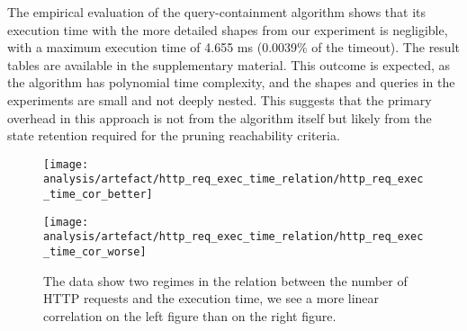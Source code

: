 The empirical evaluation of the query-containment algorithm shows that its execution time with the more detailed shapes from our experiment is negligible, with a maximum execution time of 4.655 ms (0.0039\% of the timeout).
The result tables are available in the supplementary material.
This outcome is expected, as the algorithm has polynomial time complexity, and the shapes and queries in the experiments are small and not deeply nested.
This suggests that the primary overhead in this approach is not from the algorithm itself but likely from the state retention required for the pruning reachability criteria.

\begin{figure}[htbp]
    \centering
    \begin{minipage}[t]{0.45\linewidth}
        \centering
        \texttt{[image: analysis/artefact/http\_req\_exec\_time\_relation/http\_req\_exec\_time\_cor\_better]}
        \label{fig:http_req_exec_time_cor_better}
    \end{minipage}
    \hspace{0.05\textwidth}
    \begin{minipage}[t]{0.45\linewidth}
        \centering
        \texttt{[image: analysis/artefact/http\_req\_exec\_time\_relation/http\_req\_exec\_time\_cor\_worse]}
        \label{fig:http_req_exec_time_cor_worse}
    \end{minipage}

    \caption{
        The data show two regimes in the relation between the number of HTTP requests and the execution time, 
        we see a more linear correlation on the left figure than on the right figure.
        }
    \label{fig:http_req_exec_time_cor}
\end{figure}

